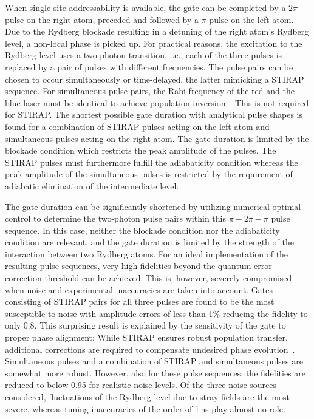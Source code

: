 When single site addressability is available, the gate can be
completed by a $2\pi$-pulse on the right atom, 
preceded and followed
by a $\pi$-pulse on the left atom.  Due to the Rydberg
blockade resulting in a detuning of the right atom's Rydberg level,
a non-local phase is picked up.
For practical reasons, the excitation to the Rydberg level uses a
two-photon transition, i.e., each of the three pulses is replaced by
a pair of pulses with different frequencies. The pulse pairs can be
chosen to occur simultaneously or time-delayed, the latter mimicking a STIRAP
sequence. For simultaneous pulse pairs, the Rabi frequency of the red and
the blue laser must be identical to achieve population
inversion~\cite{ShoreBook11}. This is not required for STIRAP.
The shortest possible gate duration with analytical pulse shapes is
found for a combination of STIRAP pulses acting on the left atom and
simultaneous pulses acting on the right atom. The gate duration is
limited by the blockade condition which restricts the peak amplitude
of the pulses. The STIRAP pulses must furthermore fulfill the
adiabaticity condition whereas the peak amplitude of the simultaneous
pulses is restricted by the requirement of adiabatic elimination of
the intermediate level. 

The gate duration can be significantly
shortened by utilizing numerical optimal control to determine the
two-photon pulse pairs
within this $\pi-2\pi-\pi$ pulse sequence. In this case,  neither the
blockade condition nor the adiabaticity condition are relevant, and
the gate duration is limited by the strength of the interaction
between two Rydberg atoms.
For an ideal implementation of the 
resulting pulse sequences, very high
fidelities beyond the quantum error correction threshold can be
achieved. This is, however, severely compromised when noise and
experimental inaccuracies are taken into account. Gates consisting
of STIRAP pairs for all three pulses are found to be the most
susceptible to noise with amplitude errors of less than 1\% reducing
the fidelity to only 0.8. This surprising result is explained by the
sensitivity of the gate to proper phase alignment: While STIRAP
ensures robust population transfer, additional corrections are
required to compensate undesired phase evolution~\cite{beterov2013quantum}.
Simultaneous pulses and a combination of
STIRAP and simultaneous pulses are somewhat more robust. However, also
for these pulse sequences, the fidelities are reduced to below 0.95
for realistic noise levels. Of the three noise sources considered,
fluctuations of the Rydberg level due to stray fields are the most
severe, whereas timing inaccuracies of the order of 1$\,$ns play
almost no role.

